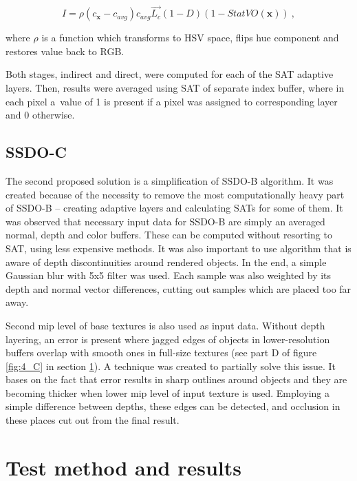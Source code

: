 \documentclass[10pt,journal,compsoc,twoside]{IEEEtran}
\begin{document}
	\begin{equation}
	I = \rho(c_{\mathbf{x}} - c_{avg})c_{avg}\vec{L_{c}}(1 - D)(1 - StatVO(\mathbf{x}))\ ,
	\end{equation}
	
	where \(\rho\) is a function which transforms to HSV space, flips hue component and restores value back to RGB.
	
	Both stages, indirect and direct, were computed for each of the SAT adaptive layers. Then, results were averaged using SAT of separate index buffer, where in each pixel a~value of 1 is present if a pixel was assigned to corresponding layer and 0 otherwise.
	
	\subsection{SSDO-C}\label{t:solutions:c}
	
	The second proposed solution is a simplification of SSDO-B algorithm. It was created because of the necessity to remove the most computationally heavy part of SSDO-B -- creating adaptive layers and calculating SATs for some of them. It was observed that necessary input data for SSDO-B are simply an averaged normal, depth and color buffers. These can be computed without resorting to SAT, using less expensive methods. It was also important to use algorithm that is aware of depth discontinuities around rendered objects. In the end, a simple Gaussian blur with 5x5 filter was used. Each sample was also weighted by its depth and normal vector differences, cutting out samples which are placed too far away.
	
	Second mip level of base textures is also used as input data. Without depth layering, an error is present where jagged edges of objects in lower-resolution buffers overlap with smooth ones in full-size textures (see part D of figure \ref{fig:4_C} in section \ref{t:tests}). A technique was created to partially solve this issue. It bases on the fact that error results in sharp outlines around objects and they are becoming thicker when lower mip level of input texture is used. Employing a simple difference between depths, these edges can be detected, and occlusion in these places cut out from the final result. 

\section{Test method and results}\label{t:tests}
\end{document}
